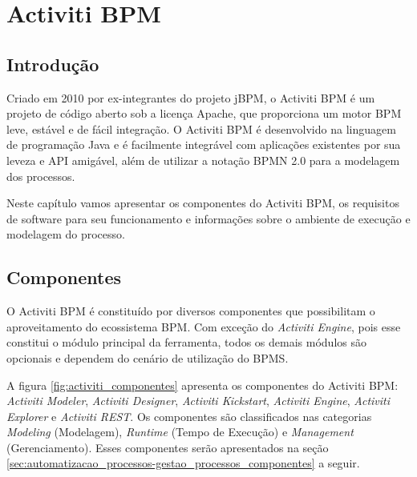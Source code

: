 \chapter{Activiti BPM}\label{chp:activiti-bpm}

\section{Introdução}\label{sec:automatizacao_processos-introducao}

Criado em 2010 por ex-integrantes do projeto jBPM\cite{bpm_jbpm}, o Activiti BPM\cite{bpm_activiti} é um projeto de código aberto sob a licença Apache\cite{apache_license}, que proporciona um motor BPM leve, estável e de fácil integração. O Activiti BPM é desenvolvido na linguagem de programação Java\cite{java-history} e é facilmente integrável com aplicações existentes por sua leveza e API\cite{api} amigável, além de utilizar a notação BPMN 2.0 para a modelagem dos processos.

Neste capítulo vamos apresentar os componentes do Activiti BPM, os requisitos de software para seu funcionamento e informações sobre o ambiente de execução e modelagem do processo.

\section{Componentes}\label{sec:automatizacao_processos-gestao_processos}

O Activiti BPM é constituído por diversos componentes que possibilitam o aproveitamento do ecossistema BPM. Com exceção do \textit{Activiti Engine}, pois esse constitui o módulo principal da ferramenta, todos os demais módulos são opcionais e dependem do cenário de utilização do BPMS.

A figura \ref{fig:activiti_componentes} apresenta os componentes do Activiti BPM: \textit{Activiti Modeler}, \textit{Activiti Designer}, \textit{Activiti Kickstart}, \textit{Activiti Engine}, \textit{Activiti Explorer} e \textit{Activiti REST}. Os componentes são classificados nas categorias \textit{Modeling} (Modelagem), \textit{Runtime} (Tempo de Execução) e \textit{Management} (Gerenciamento). Esses componentes serão apresentados na seção \ref{sec:automatizacao_processos-gestao_processos_componentes} a seguir.

